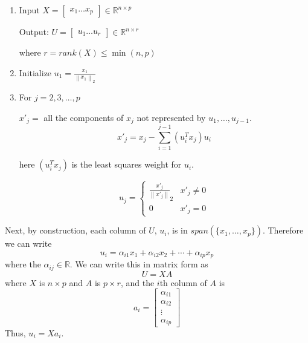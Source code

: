 \documentclass[12pt]{article}
\theoremstyle{definition}
\newcommand{\R}{\mathbb{R}}
\newcommand{\norm}[1]{\left\lVert#1\right\rVert}
\begin{document}
\begin{enumerate}
	\item Input $X = \begin{bmatrix} x_1 \ldots x_p \end{bmatrix} \in \R^{n \times p}$ 

	Output: $U = \begin{bmatrix} u_1 \ldots u_r \end{bmatrix} \in \R^{n \times r}$

	where $r = rank(X) \leq \min(n,p)$

	\item Initialize $u_1 = \frac{x_1}{\norm{x_1}_2}$
	\item For $j=2,3, \ldots, p$
	
	$x'_j = $ all the components of $x_j$ not represented by $u_1, \ldots, u_{j-1}$. 
	\begin{equation}
		x'_j = x_j - \sum_{i=1}^{j-1} (u_i^T x_j) u_i
	\end{equation}

	here $(u_i^T x_j)$ is the least squares weight for $u_i$. 

	\begin{equation}
	u_j = 
	\begin{cases}
	\frac{x'_j}{\norm{x'_j}}_2 & x'_j \neq 0 \\
	0 & x'_j = 0
	\end{cases}
	\end{equation}

\end{enumerate}

Next, by construction, each column of $U$, $u_i$, is in $span(\{x_1, \ldots, x_p\})$. Therefore we can write
\begin{equation}
	u_i = \alpha_{i1}x_1 + \alpha_{i2}x_2 + \cdots + \alpha_{ip}x_p
\end{equation}
where the $\alpha_{ij} \in \R$. We can write this in matrix form as
\begin{equation}
	U = X A
\end{equation}
where $X$ is $n \times p$ and $A$ is $p \times r$, and the $i$th column of $A$ is
\begin{equation}
	a_i = 
	\begin{bmatrix}
	\alpha_{i1} \\
	\alpha_{i2} \\
	\vdots \\
	\alpha_{ip}
	\end{bmatrix}
\end{equation}
Thus, $u_i = Xa_i$. 
\end{document}
